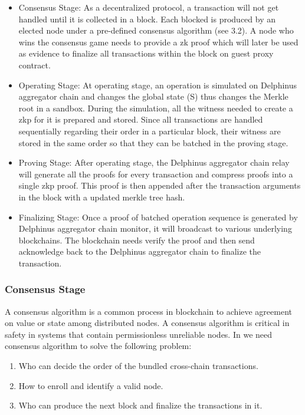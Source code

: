 \documentclass[pageno]{jpaper}
\begin{document}
\begin{itemize}[leftmargin=*]
\item Consensus Stage: As a decentralized protocol, a transaction will not get handled until it is collected in a block. Each blocked is produced by an elected node under a pre-defined consensus algorithm (see 3.2). A node who wins the consensus game needs to provide a zk proof which will later be used as evidence to finalize all transactions within the block on guest proxy contract.

\item Operating Stage: At operating stage, an operation is simulated on Delphinus aggregator chain and changes the global state (S) thus changes the Merkle root in a sandbox. During the simulation, all the witness needed to create a zkp for it is prepared and stored. Since all transactions are handled sequentially regarding their order in a particular block, their witness are stored in the same order so that they can be batched in the proving stage. 

\item Proving Stage: After operating stage, the Delphinus aggregator chain relay will generate all the proofs for every transaction and compress proofs into a single zkp proof. This proof is then appended after the transaction arguments in the block with a updated merkle tree hash. 
\item Finalizing Stage: Once a proof of batched operation sequence is generated by Delphinus aggregator chain monitor, it will broadcast to various underlying blockchains. The blockchain needs verify the proof and then send acknowledge back to the Delphinus aggregator chain to finalize the transaction.
\end{itemize}


\subsubsection{Consensus Stage}
\label{consensus-stage}
A consensus algorithm is a common process in blockchain to achieve agreement on value or state among distributed nodes. A consensus algorithm is critical in safety in systems that contain permissionless unreliable nodes. In \dprotocol we need consensus algorithm to solve the following problem:

\begin{enumerate}[leftmargin=*]
\item Who can decide the order of the bundled cross-chain transactions.
\item How to enroll and identify a valid node.
\item Who can produce the next block and finalize the transactions in it. 
\end{enumerate}
\end{document}
